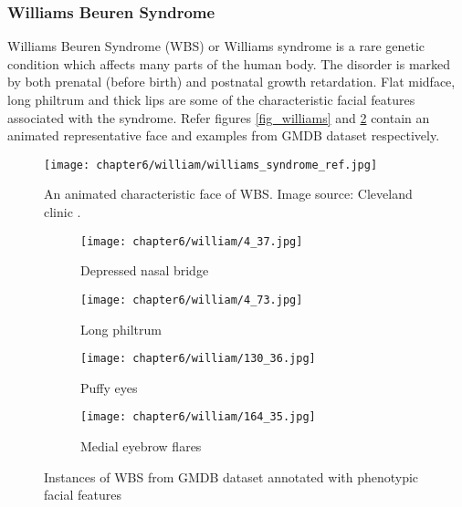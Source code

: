 \documentclass[../report.tex]{subfiles}
\begin{document}
	\subsubsection{Williams Beuren Syndrome}
	Williams Beuren Syndrome (WBS) or Williams syndrome is a rare genetic condition which affects many parts of the human body. The disorder is marked by both prenatal (before birth) and postnatal growth retardation. Flat midface, long philtrum and thick lips are some of the characteristic facial features associated with the syndrome. Refer figures \ref{fig_williams} and \ref{fig_wil_gmdb} contain an animated representative face and examples from GMDB dataset respectively. 
	\begin{figure}[H]\label{fig_williams_char}
	\centering
	\texttt{[image: chapter6/william/williams\_syndrome\_ref.jpg]}	
	\caption[An animated characteristic face of WBS]{An animated characteristic face of WBS. Image source: Cleveland clinic \protect\footnotemark.} 
	\end{figure}
	\begin{figure}[H]\label{fig_williams}
		\centering
		\begin{subfigure}[t]{0.24\textwidth}
			\centering
			\texttt{[image: chapter6/william/4\_37.jpg]}
			\caption{Depressed nasal bridge}
		\end{subfigure}
		\begin{subfigure}[t]{0.24\textwidth}
			\centering
			\texttt{[image: chapter6/william/4\_73.jpg]}
			\caption{Long philtrum}
		\end{subfigure}	
			\begin{subfigure}[t]{0.24\textwidth}
			\centering
			\texttt{[image: chapter6/william/130\_36.jpg]}
			\caption{Puffy eyes}
		\end{subfigure}	
			\begin{subfigure}[t]{0.24\textwidth}
			\centering
			\texttt{[image: chapter6/william/164\_35.jpg]}
			\caption{Medial eyebrow flares}
		\end{subfigure}	
	\caption[Instances of WBS from GMDB dataset]{Instances of WBS from GMDB dataset annotated with phenotypic facial features}
	\label{fig_wil_gmdb}
	\end{figure}
\end{document}
